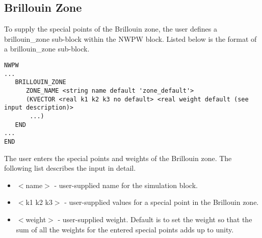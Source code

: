 \subsection{Brillouin Zone}
\label{sec:band_brillouin_zone}
To supply the special points of the Brillouin zone,
the user defines a brillouin\_zone sub-block within the NWPW 
block.  Listed below is the format of a brillouin\_zone sub-block.
\begin{verbatim}
NWPW
...
   BRILLOUIN_ZONE
      ZONE_NAME <string name default 'zone_default'>
      (KVECTOR <real k1 k2 k3 no default> <real weight default (see input description)>
       ...)
   END
...
END
\end{verbatim}
The user enters the special points and weights of the
Brillouin zone.  The following list describes the input in detail.
\begin{itemize}
        \item $<$name$>$ - user-supplied name for the simulation block. 
        \item $<$k1 k2 k3$>$ - user-supplied values for a special point in the
                               Brillouin zone.
        \item $<$weight$>$ - user-supplied weight.  Default is to set the weight
                         so that the sum of all the weights for the entered  
                         special points adds up to unity.
\end{itemize}


\normalsize
